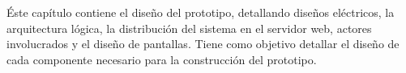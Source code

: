 %

Éste capítulo  contiene el diseño del prototipo, detallando diseños eléctricos, 
la arquitectura lógica, la distribución del sistema en el servidor web, actores 
involucrados y el diseño de pantallas. Tiene como objetivo detallar el diseño de 
cada componente necesario para la construcción del prototipo.


